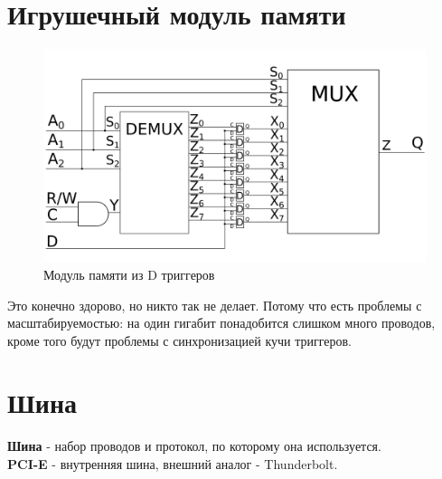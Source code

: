 \documentclass[12pt, a4paper]{article}
\begin{document}
\section{Игрушечный модуль памяти}
\begin{figure}[h]
    \centering
    \includegraphics[scale=0.1]{./images/8bitmemory.png}
    \caption{Модуль памяти из D триггеров}
    \label{fig:my_label}
\end{figure}
Это конечно здорово, но никто так не делает. Потому что есть проблемы с масштабируемостью: на один гигабит понадобится слишком много проводов, кроме того будут проблемы с синхронизацией кучи триггеров.
\section{Шина}
\textbf{Шина} - набор проводов и протокол, по которому она используется.\\
\textbf{PCI-E} - внутренняя шина, внешний аналог - Thunderbolt.
\end{document}

